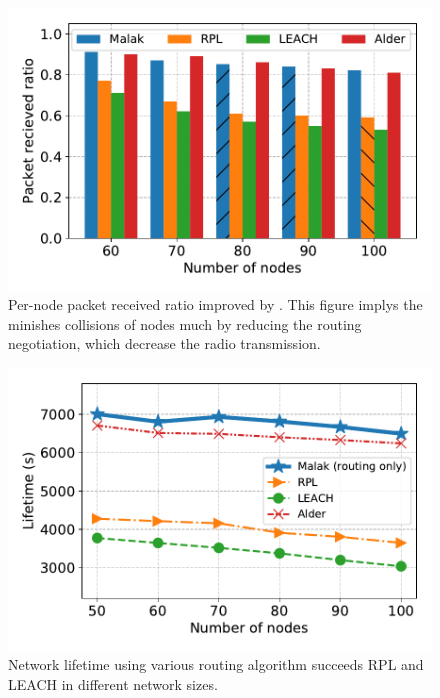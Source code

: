 \begin{figure}[htbp]
	\centering
	\includegraphics[width=.95\columnwidth]{Figure/packet_loss_ratio_with_size}
	\vspace{-0.1in}
	\caption{Per-node packet received ratio improved by {\sdn}.
		\textnormal{
			This figure implys the {\sdn} minishes collisions of nodes much by
			reducing the routing negotiation, which decrease the radio
			transmission.
		}}
	\label{fig:packet_loss_ratio_with_size}
\end{figure}

\begin{figure}[htbp]
	\centering
	\includegraphics[width=.95\columnwidth]{Figure/lifetime}
	\vspace{-0.1in}
	\caption{Network lifetime using various routing algorithm
		\textnormal{
			{\sdn} succeeds RPL and LEACH in different network sizes.
		}}
	\label{fig:lifetime}
\end{figure}

